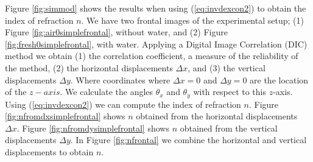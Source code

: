 \documentclass[smallextended]{svjour3}       %
\begin{document}

Figure \ref{fig:simmod} shows the results when using (\ref{eq:invdexcon2}) to obtain the index of refraction $n$. We have two frontal images of the experimental setup; (1) Figure \ref{fig:air0simplefrontal}, without water, and (2) Figure \ref{fig:fresh0simplefrontal}, with water.  Applying a Digital Image Correlation (DIC) method we obtain (1) the correlation coefficient, a measure of the reliability of the method, (2) the horizontal displacements $\Delta x$, and (3) the vertical displacements $\Delta y$. Where coordinates where $\Delta x = 0$ and $\Delta y = 0$ are the location of the $z-axis$. We calculate the angles $\theta_x$ and $\theta_y$ with respect to this $z$-axis. Using (\ref{eq:invdexcon2}) we can compute the index of refraction $n$. Figure \ref{fig:nfromdxsimplefrontal} shows $n$ obtained from the horizontal displacements $\Delta x$.  Figure \ref{fig:nfromdysimplefrontal} shows $n$ obtained from the vertical displacements $\Delta y$. In Figure \ref{fig:nfrontal} we combine the horizontal and vertical displacements to obtain $n$.
\end{document}
